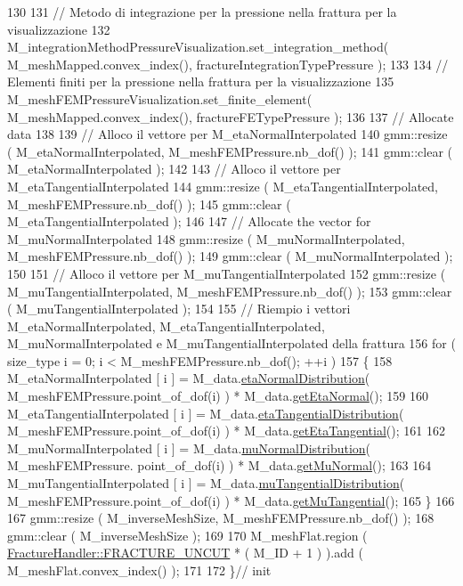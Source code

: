 \begin{DoxyCode}
130 
131     \textcolor{comment}{// Metodo di integrazione per la pressione nella frattura per la visualizzazione}
132     M\_integrationMethodPressureVisualization.set\_integration\_method( M\_meshMapped.convex\_index(), 
      fractureIntegrationTypePressure );
133 
134     \textcolor{comment}{// Elementi finiti per la pressione nella frattura per la visualizzazione}
135     M\_meshFEMPressureVisualization.set\_finite\_element( M\_meshMapped.convex\_index(), fractureFETypePressure 
      );
136 
137     \textcolor{comment}{// Allocate data}
138 
139     \textcolor{comment}{// Alloco il vettore per M\_etaNormalInterpolated}
140     gmm::resize ( M\_etaNormalInterpolated, M\_meshFEMPressure.nb\_dof() );
141     gmm::clear ( M\_etaNormalInterpolated );
142 
143     \textcolor{comment}{// Alloco il vettore per M\_etaTangentialInterpolated}
144     gmm::resize ( M\_etaTangentialInterpolated, M\_meshFEMPressure.nb\_dof() );
145     gmm::clear ( M\_etaTangentialInterpolated );
146 
147     \textcolor{comment}{// Allocate the vector for M\_muNormalInterpolated}
148     gmm::resize ( M\_muNormalInterpolated, M\_meshFEMPressure.nb\_dof() );
149     gmm::clear ( M\_muNormalInterpolated );
150 
151     \textcolor{comment}{// Alloco il vettore per M\_muTangentialInterpolated}
152     gmm::resize ( M\_muTangentialInterpolated, M\_meshFEMPressure.nb\_dof() );
153     gmm::clear ( M\_muTangentialInterpolated );
154 
155     \textcolor{comment}{// Riempio i vettori M\_etaNormalInterpolated, M\_etaTangentialInterpolated, M\_muNormalInterpolated e
       M\_muTangentialInterpolated della frattura}
156     \textcolor{keywordflow}{for} ( size\_type i = 0; i < M\_meshFEMPressure.nb\_dof(); ++i )
157     \{
158         M\_etaNormalInterpolated [ i ] = M\_data.\hyperlink{classFractureData_a0aaeeb3d9eedd46175759cd6b9536484}{etaNormalDistribution}( 
      M\_meshFEMPressure.point\_of\_dof(i) ) * M\_data.\hyperlink{classFractureData_a9acc76c77282d4b5d0cdca18c2b1b9ea}{getEtaNormal}();
159 
160         M\_etaTangentialInterpolated [ i ] = M\_data.\hyperlink{classFractureData_a0f989b64832a1f0fc77632c6803f102c}{etaTangentialDistribution}( 
      M\_meshFEMPressure.point\_of\_dof(i) ) * M\_data.\hyperlink{classFractureData_a7378053b4009825b4a2957484cb2a5e8}{getEtaTangential}();
161 
162         M\_muNormalInterpolated [ i ] = M\_data.\hyperlink{classFractureData_a4ae566f9148893e47279097cab215e7b}{muNormalDistribution}( M\_meshFEMPressure.
      point\_of\_dof(i) ) * M\_data.\hyperlink{classFractureData_ab059ac23b93115e05029e1b6cadd1cd9}{getMuNormal}();
163 
164         M\_muTangentialInterpolated [ i ] = M\_data.\hyperlink{classFractureData_a9a3e1a75231b55be01ad198b824c0d56}{muTangentialDistribution}( 
      M\_meshFEMPressure.point\_of\_dof(i) ) * M\_data.\hyperlink{classFractureData_a1ac3cca1ae035eedb2ec89c0517f8b1f}{getMuTangential}();
165     \}
166 
167     gmm::resize ( M\_inverseMeshSize, M\_meshFEMPressure.nb\_dof() );
168     gmm::clear ( M\_inverseMeshSize );
169 
170     M\_meshFlat.region ( \hyperlink{classFractureHandler_a495ad4fc72d0c47c8f0424842f1153aaaa992cc3ad024a030ecd798dc319c95ac}{FractureHandler::FRACTURE\_UNCUT} * ( M\_ID + 1 ) ).add
       ( M\_meshFlat.convex\_index() );
171 
172 \}\textcolor{comment}{// init}
\end{DoxyCode}
